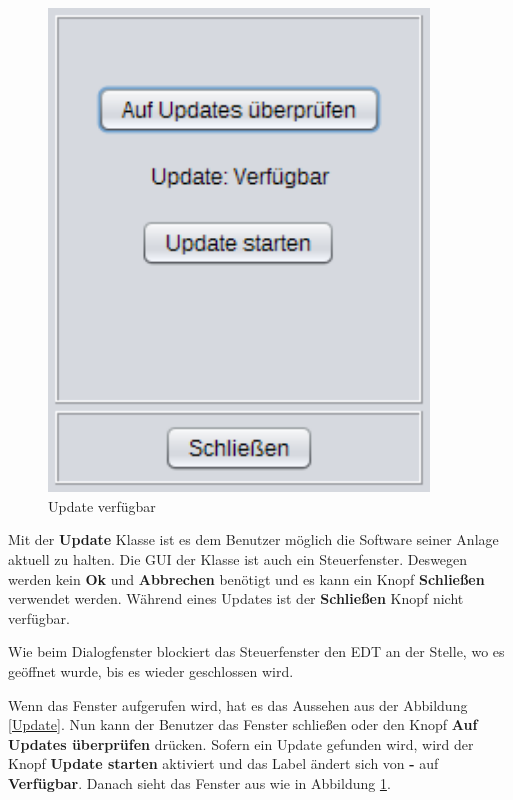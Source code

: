 \begin{figure}[H]
\begin{minipage}[hbt]{0.45\textwidth}
    \includegraphics[width=0.9\textwidth]{Bilder/GUI/Update2}
  	\caption{Update verfügbar}
  	\label{Update2}
  \end{minipage}
  \vspace{0pt}
\end{figure}
Mit der \textbf{Update} Klasse ist es dem Benutzer möglich die Software seiner Anlage aktuell zu halten. Die \ac{GUI} der Klasse ist auch ein Steuerfenster. Deswegen werden kein \textbf{Ok} und \textbf{Abbrechen} benötigt und es kann ein Knopf \textbf{Schließen} verwendet werden. Während eines Updates ist der \textbf{Schließen} Knopf nicht verfügbar.

\vspace{10pt}

Wie beim Dialogfenster blockiert das Steuerfenster den \ac{EDT} an der Stelle, wo es geöffnet wurde, bis es wieder geschlossen wird.

\vspace{10pt}

Wenn das Fenster aufgerufen wird, hat es das Aussehen aus der Abbildung \ref{Update}. Nun kann der Benutzer das Fenster schließen oder den Knopf \textbf{Auf Updates überprüfen} drücken. Sofern ein Update gefunden wird, wird der Knopf \textbf{Update starten} aktiviert und das Label ändert sich von \textbf{-} auf \textbf{Verfügbar}. Danach sieht das Fenster aus wie in Abbildung \ref{Update2}.

